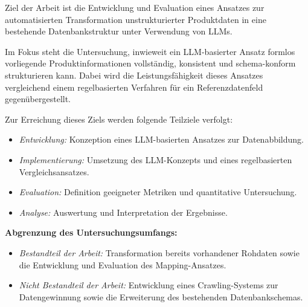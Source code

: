 Ziel der Arbeit ist die Entwicklung und Evaluation eines Ansatzes zur automatisierten Transformation unstrukturierter Produktdaten in eine bestehende Datenbankstruktur unter Verwendung von LLMs.

Im Fokus steht die Untersuchung, inwieweit ein LLM-basierter Ansatz formlos vorliegende Produktinformationen vollständig, konsistent und schema-konform strukturieren kann. Dabei wird die Leistungsfähigkeit dieses Ansatzes vergleichend einem regelbasierten Verfahren für ein Referenzdatenfeld gegenübergestellt.

Zur Erreichung dieses Ziels werden folgende Teilziele verfolgt:

\begin{itemize}
    \setlength{\itemsep}{0pt}
    \item \textit{Entwicklung:} Konzeption eines LLM-basierten Ansatzes zur Datenabbildung.
    \item \textit{Implementierung:} Umsetzung des LLM-Konzepts und eines regelbasierten Vergleichsansatzes.
    \item \textit{Evaluation:} Definition geeigneter Metriken und quantitative Untersuchung.
    \item \textit{Analyse:} Auswertung und Interpretation der Ergebnisse.
\end{itemize}

\textbf{Abgrenzung des Untersuchungsumfangs:}

\begin{itemize}
    \setlength{\itemsep}{0pt}
    \item \textit{Bestandteil der Arbeit:} Transformation bereits vorhandener Rohdaten sowie die Entwicklung und Evaluation des Mapping-Ansatzes.
    \item \textit{Nicht Bestandteil der Arbeit:} Entwicklung eines Crawling-Systems zur Datengewinnung sowie die Erweiterung des bestehenden Datenbankschemas.
\end{itemize}